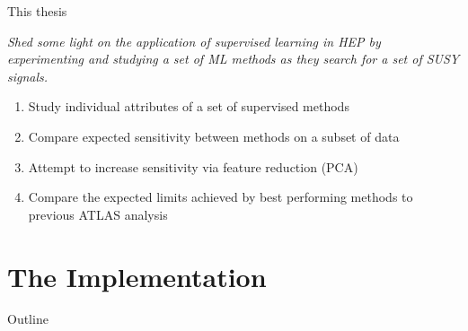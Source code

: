 \documentclass[UKenglish]{beamer}
\begin{document}
\begin{frame}{This thesis}
    \begin{center}
        \emph{Shed some light on the application of supervised learning in HEP by 
        experimenting and studying a set of ML methods as they search for a set of SUSY signals.}
    \end{center}
    \vspace{0.5cm}
    \begin{enumerate}
        \item Study individual attributes of a set of supervised methods 
        \item Compare expected sensitivity between methods on a subset of data
        \item Attempt to increase sensitivity via feature reduction (PCA)
        \item Compare the expected limits achieved by best performing methods 
              to previous ATLAS analysis
    \end{enumerate}
\end{frame}

\section{The Implementation}
\begin{frame}{Outline}
    \tableofcontents[currentsection]
\end{frame}
\end{document}
